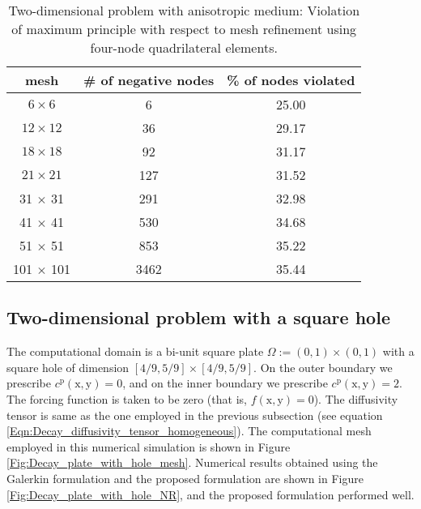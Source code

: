 \documentclass[11pt]{amsart}
\begin{document}
\begin{table}[t]
  \centering
  \caption{Two-dimensional problem with anisotropic medium: Violation of maximum 
    principle with respect to mesh refinement using four-node quadrilateral elements. 
    \label{Table:Decay_square_plate_Q4}}
  \begin{tabular}{|c|c|c|} \hline
    \textbf{mesh} & \textbf{\# of negative nodes} & \textbf{\% of nodes violated} \\ \hline
    $6 \times 6$ & 6 & 25.00                  \\ \hline
    $12 \times 12$  & 36 & 29.17          \\ \hline
    $18 \times 18$ & 92 & 31.17           \\ \hline
    $21 \times 21$ & 127 & 31.52         \\ \hline
    31 $\times$ 31 & 291 & 32.98         \\ \hline
    41 $\times$ 41 & 530 & 34.68         \\ \hline
    51 $\times$ 51 & 853 & 35.22         \\ \hline
    101 $\times$ 101 & 3462 & 35.44  \\ \hline
  \end{tabular}
\end{table}

\subsection{Two-dimensional problem with a square hole}
The computational domain is a bi-unit square plate $\Omega := (0, 1) \times (0, 1)$ with a square 
hole of dimension $[4/9, 5/9] \times [4/9, 5/9]$. On the outer boundary we prescribe $c^{\mathrm{p}}
(\mathrm{x},\mathrm{y}) = 0$, and on the inner boundary we prescribe $c^{\mathrm{p}}(\mathrm{x},
\mathrm{y}) = 2$. The forcing function is taken to be zero (that is, $f(\mathrm{x},\mathrm{y}) = 0$). The 
diffusivity tensor is same as the one employed in the previous subsection (see equation 
\eqref{Eqn:Decay_diffusivity_tensor_homogeneous}). The computational mesh employed in this 
numerical simulation is shown in Figure \ref{Fig:Decay_plate_with_hole_mesh}. Numerical results 
obtained using the Galerkin formulation and the proposed formulation are shown in Figure 
\ref{Fig:Decay_plate_with_hole_NR}, and the proposed formulation performed well.
\end{document}
